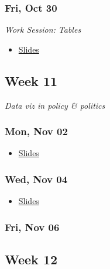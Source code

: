 \documentclass[
  letterpaper,
  DIV=11,
  numbers=noendperiod]{scrartcl}
\providecommand{\tightlist}{%
  \setlength{\itemsep}{0pt}\setlength{\parskip}{0pt}}
\begin{document}
\subsubsection*{Fri, Oct 30}\label{fri-oct-30}

\emph{Work Session: Tables}

\begin{itemize}
\tightlist
\item
  \href{404.qmd}{Slides}
\end{itemize}

\subsection*{Week 11}\label{week-11}

\emph{Data viz in policy \& politics}

\subsubsection*{Mon, Nov 02}\label{mon-nov-02}

\begin{itemize}
\tightlist
\item
  \href{404.qmd}{Slides}
\end{itemize}

\subsubsection*{Wed, Nov 04}\label{wed-nov-04}

\begin{itemize}
\tightlist
\item
  \href{404.qmd}{Slides}
\end{itemize}

\subsubsection*{Fri, Nov 06}\label{fri-nov-06}

\subsection*{Week 12}\label{week-12}
\end{document}
